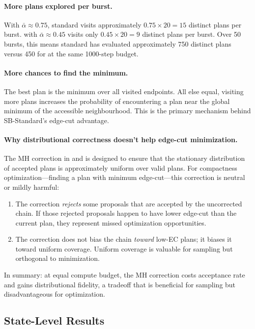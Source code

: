 \paragraph{More plans explored per burst.}
With $\bar\alpha \approx 0.75$, standard \sburst{} visits approximately
$0.75 \times 20 = 15$ distinct plans per burst.
\sbf{} with $\bar\alpha \approx 0.45$ visits only $0.45 \times 20 = 9$
distinct plans per burst.
Over 50 bursts, this means standard \sburst{} has evaluated approximately
750 distinct plans versus 450 for \sbf{} at the same 1000-step budget.

\paragraph{More chances to find the minimum.}
The best plan is the minimum over all visited endpoints.
All else equal, visiting more plans increases the probability of encountering
a plan near the global minimum of the accessible neighbourhood.
This is the primary mechanism behind SB-Standard's edge-cut advantage.

\paragraph{Why distributional correctness doesn't help edge-cut minimization.}
The MH correction in \frecom{} and \ms{} is designed to ensure that the
stationary distribution of accepted plans is approximately uniform over
valid plans.
For compactness optimization---finding a plan with minimum edge-cut---this
correction is neutral or mildly harmful:
\begin{enumerate}
  \item The correction \emph{rejects} some proposals that are accepted by
        the uncorrected \recom{} chain.
        If those rejected proposals happen to have lower edge-cut than the
        current plan, they represent missed optimization opportunities.
  \item The correction does not bias the chain \emph{toward} low-EC plans;
        it biases it toward uniform coverage.
        Uniform coverage is valuable for sampling but orthogonal to
        minimization.
\end{enumerate}
In summary: at equal compute budget, the MH correction costs acceptance
rate and gains distributional fidelity, a tradeoff that is beneficial for
sampling but disadvantageous for optimization.

\subsection{State-Level Results}


